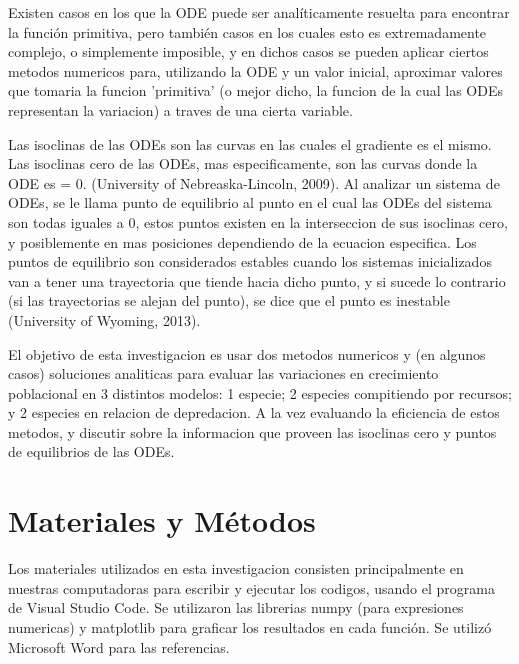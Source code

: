 \documentclass{article}
\begin{document}
\noindent Existen casos en los que la ODE puede ser analíticamente resuelta para encontrar la función primitiva, pero también casos en los cuales esto es extremadamente complejo, o simplemente imposible, y en dichos casos se pueden aplicar ciertos metodos numericos para, utilizando la ODE y un valor inicial, aproximar valores que tomaria la funcion 'primitiva' (o mejor dicho, la funcion de la cual las ODEs representan la variacion) a traves de una cierta variable. \vspace{\baselineskip}


\noindent Las isoclinas de las ODEs son las curvas en las cuales el gradiente es el mismo. Las isoclinas cero de las ODEs, mas especificamente, son las curvas donde la ODE es = 0. (University of Nebreaska-Lincoln, 2009). Al analizar un sistema de ODEs, se le llama punto de equilibrio al punto en el cual las ODEs del sistema son todas iguales a 0, estos puntos existen en la interseccion de sus isoclinas cero, y posiblemente en mas posiciones dependiendo de la ecuacion especifica. Los puntos de equilibrio son considerados estables cuando los sistemas inicializados van a tener una trayectoria que tiende hacia dicho punto, y si sucede lo contrario (si las trayectorias se alejan del punto), se dice que el punto es inestable (University of Wyoming, 2013). \vspace{\baselineskip}

\noindent El objetivo de esta investigacion es usar dos metodos numericos y (en algunos casos) soluciones analiticas para evaluar las variaciones en crecimiento poblacional en 3 distintos modelos: 1 especie; 2 especies compitiendo por recursos; y 2 especies en relacion de depredacion. A la vez evaluando la eficiencia de estos metodos, y discutir sobre la informacion que proveen las isoclinas cero y puntos de equilibrios de las ODEs.

\vspace{0.5\baselineskip}

\section*{Materiales y Métodos}

\noindent Los materiales utilizados en esta investigacion consisten principalmente en nuestras computadoras para escribir y ejecutar los codigos, usando el programa de Visual Studio Code. Se utilizaron las librerias numpy (para expresiones numericas) y matplotlib para graficar los resultados en cada función. Se utilizó Microsoft Word para las referencias.
\end{document}
